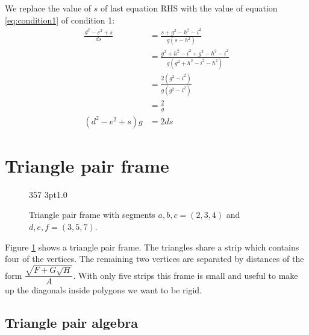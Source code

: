 \documentclass[11pt]{article}
\begin{document}
We replace the value of $s$ of last equation RHS with the value of equation \ref{eq:condition1}
of condition 1:
\begin{align}
\frac{d^2 - e^2 + s}{ds} &= \frac{s + g^2 - h^2 - i^2}{g(s-h^2)} \nonumber\\
 &= \frac{g^2 + h^2 - i^2 + g^2 - h^2 - i^2}{g(g^2 + h^2 - i^2-h^2)} \nonumber\\
 &= \frac{2(g^2 - i^2)}{g(g^2 - i^2)} \nonumber\\
 &= \frac{2}{g} \nonumber\\
(d^2 - e^2 + s)g &= 2ds \label{eq:condition2}
\end{align}




\section{Triangle pair frame}

\begin{figure}[H]
\centering
\begin{center}
 {3}{5}{7} {3pt}{1.0}
\end{center}
\caption{Triangle pair frame with segments $a,b,c=(2,3,4)$ and $d,e,f=(3,5,7)$.}
\label{fig:tripair}
\end{figure}

Figure \ref{fig:tripair} shows a triangle pair frame. The triangles share a strip which contains four of the vertices.
The remaining two vertices are separated by distances of the form $\dfrac{\sqrt{F+G\sqrt{H}}}A$. With only five strips this frame is small and useful to make up the diagonals inside polygons we want to be rigid.

\subsection{Triangle pair algebra}
\end{document}
